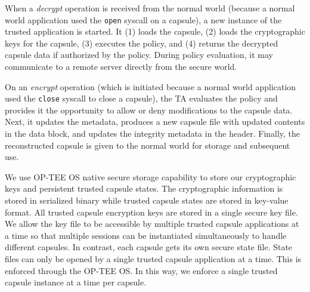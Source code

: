 When a {\em decrypt} operation is received from the normal world (because a
normal world application used the {\tt open} syscall on a capsule), a new
instance of the trusted application is started. It (1) loads the capsule, (2)
loads the cryptographic keys for the capsule, (3) executes the policy, and (4)
returns the decrypted capsule data if authorized by the policy. During policy
evaluation, it may communicate to a remote server directly from the secure world.

On an {\em encrypt} operation (which is initiated because a normal world
application used the {\tt close} syscall to close a capsule), the TA evaluates
the policy and provides it the opportunity to allow or deny modifications to the
capsule data. Next, it updates the metadata, produces a new capsule file with
updated contents in the data block, and updates the integrity metadata in the
header. Finally, the reconstructed capsule is given to the normal world for
storage and subsequent use.



We use OP-TEE OS native secure storage capability to store our cryptographic
keys and persistent trusted capsule states. The cryptographic information is stored
in serialized binary while trusted capsule states are stored in key-value
format. All trusted capsule encryption keys are stored in a single secure key
file. We allow the key file to be accessible by multiple trusted capsule
applications at a time so that multiple sessions can be instantiated
simultaneously to handle different capsules. In contrast, each capsule gets its
own secure state file. State files can only be opened by a single trusted
capsule application at a time. This is enforced through the OP-TEE OS. In this
way, we enforce a single trusted capsule instance at a time per capsule.

